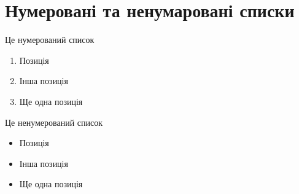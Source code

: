 \section{Нумеровані та ненумаровані списки}

Це нумерований список

\begin{enumerate}
    \item Позиція 
    \item Інша позиція
    \item Ще одна позиція
\end{enumerate}

\vspace{2em} %

Це ненумерований список

\begin{itemize}
    \item Позиція 
    \item Інша позиція
    \item Ще одна позиція
\end{itemize}
    